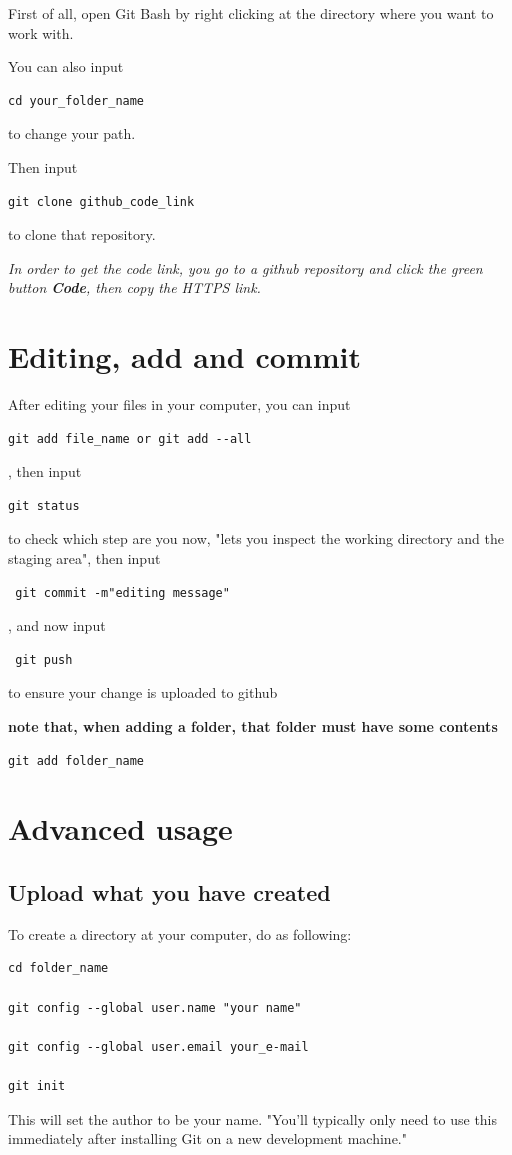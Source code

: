 \documentclass[UTF8]{article}
\begin{document}
First of all, open Git Bash by right clicking at the directory where you want to work with. 

You can also input 
\begin{verbatim}
cd your_folder_name
\end{verbatim}
to change your path. 

Then input 
\begin{verbatim}
git clone github_code_link
\end{verbatim}
 to clone that repository. 

\textit{In order to get the code link, you go to a github repository and click the green button \textbf{Code}, then copy the HTTPS link. }

\section{Editing, add and commit}
After editing your files in your computer, you can input \begin{verbatim}
git add file_name or git add --all \end{verbatim}, then input \begin{verbatim}
git status \end{verbatim} to check which step are you now, "lets you inspect the working directory and the staging area", then input \begin{verbatim} git commit -m"editing message" \end{verbatim}, and now input \begin{verbatim} git push \end{verbatim} to ensure your change is uploaded to github

\textbf{note that, when adding a folder, that folder must have some contents}
\begin{verbatim}
git add folder_name
\end{verbatim}

\section{Advanced usage}
\subsection{Upload what you have created}
To create a directory at your computer, do as following:  \begin{verbatim}
cd folder_name

git config --global user.name "your name"

git config --global user.email your_e-mail

git init
\end{verbatim}
This will set the author to be your name. "You’ll typically only need to use this immediately after installing Git on a new development machine."
\end{document}
